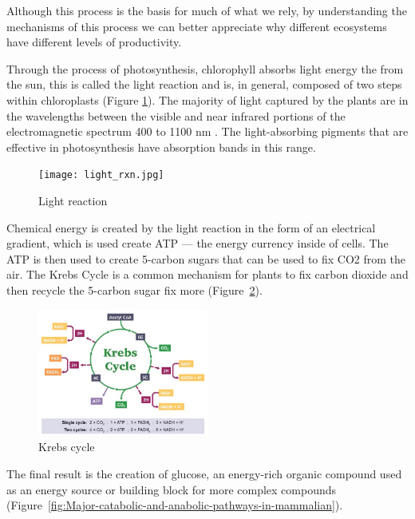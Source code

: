Although this process is the basis for much of what we rely, by understanding the mechanisms of this process we can better appreciate why different ecosystems have different levels of productivity. 


Through the process of \gls{photosynthesis}, chlorophyll absorbs light energy the from the sun, this is called the light reaction and is, in general, composed of two steps within \gls{chloroplasts} (Figure \ref{fig:light_rxn}). The majority of light captured by the plants are in the wavelengths between the visible and near infrared portions of the electromagnetic spectrum 400 to 1100 nm \citep{stenberg2010visible}. The light-absorbing pigments that are effective in photosynthesis have absorption bands in this range.

\begin{figure}[htb]
	\centering
\texttt{[image: light\_rxn.jpg]}
	\caption{Light reaction}
	\label{fig:light_rxn}
\end{figure}

Chemical energy is created by the light reaction in the form of an electrical gradient, which is used create ATP --- the energy currency inside of cells. The ATP is then used to create 5-carbon sugars that can be used to fix CO2 from the air. The Krebs Cycle is a common mechanism for plants to fix carbon dioxide and then recycle the 5-carbon sugar fix more \CO (Figure~\ref{fig:krebs-cycle_med}). 

\begin{figure}[htb]
	\centering
\includegraphics[width=0.50\textwidth]{graphics/krebs-cycle_med.jpeg}
	\caption{Krebs cycle}
	\label{fig:krebs-cycle_med}
\end{figure}


The final result is the creation of glucose, an energy-rich organic compound used as an energy source or building block for more complex compounds (Figure~\ref{fig:Major-catabolic-and-anabolic-pathways-in-mammalian}). 
  
